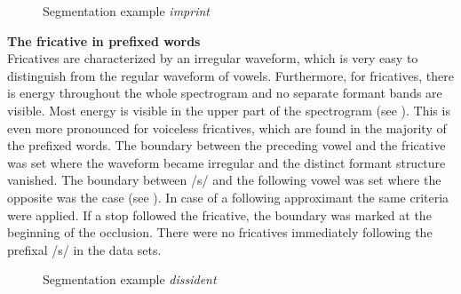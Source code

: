 \begin{figure}[h!]
	\centering
	\caption{Segmentation example \textit{imprint}}
	\label{fig:segmentation imprint}
\end{figure}


\textbf{The fricative in prefixed words}\\




Fricatives are characterized by an irregular waveform, which is very easy to distinguish from the regular waveform of vowels. Furthermore, for fricatives, there is energy throughout the whole spectrogram and no separate formant bands are visible. Most energy is visible in the upper part of the spectrogram (see ). This is even more pronounced for voiceless fricatives, which are found in the majority of the prefixed words.
The boundary between the preceding vowel and the fricative was set where the waveform became irregular and the distinct formant structure vanished. The boundary between /s/ and the following vowel was set where the opposite was the case (see ). In case of a following approximant the same criteria were applied. If a stop followed the fricative, the boundary was marked at the beginning of the occlusion. There were no fricatives immediately following the prefixal /s/ in the data sets.\\

\begin{figure} [H]
	\centering
	\caption{Segmentation example \textit{dissident}}
	\label{fig:segmentation dissident}
\end{figure}



